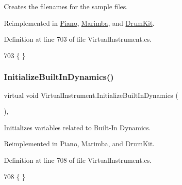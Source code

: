 Creates the filenames for the sample files. 



Reimplemented in \hyperlink{group___piano_virt_func_gaafd50f0f04ea7ea4f560accc628b8f1b}{Piano}, \hyperlink{group___mar_virt_func_gae57d9737fd07708dc7e13e74ee777878}{Marimba}, and \hyperlink{class_drum_kit_a25bb92cf56bc1b3434465faf73cd09cf}{Drum\+Kit}.



Definition at line 703 of file Virtual\+Instrument.\+cs.


\begin{DoxyCode}
703 \{ \}
\end{DoxyCode}
\mbox{\label{group___v_i_base_virt_func_ga995456c03ee54543b285188c51c29a07}} 
\subsubsection{\texorpdfstring{Initialize\+Built\+In\+Dynamics()}{InitializeBuiltInDynamics()}}
{\footnotesize\ttfamily virtual void Virtual\+Instrument.\+Initialize\+Built\+In\+Dynamics (\begin{DoxyParamCaption}{ }\end{DoxyParamCaption})\hspace{0.3cm}{\ttfamily [protected]}, {\ttfamily [virtual]}}



Initializes variables related to \hyperlink{group___audio_DefBID}{Built-\/\+In Dynamics}. 



Reimplemented in \hyperlink{group___piano_virt_func_ga6bc02528f8808b8a30aa7d5776445a6d}{Piano}, \hyperlink{group___mar_virt_func_ga293d829cb8571c21452c23e90968b2d8}{Marimba}, and \hyperlink{class_drum_kit_ad14c6155e6ec62f26a30261e273d6379}{Drum\+Kit}.



Definition at line 708 of file Virtual\+Instrument.\+cs.


\begin{DoxyCode}
708 \{ \}
\end{DoxyCode}
